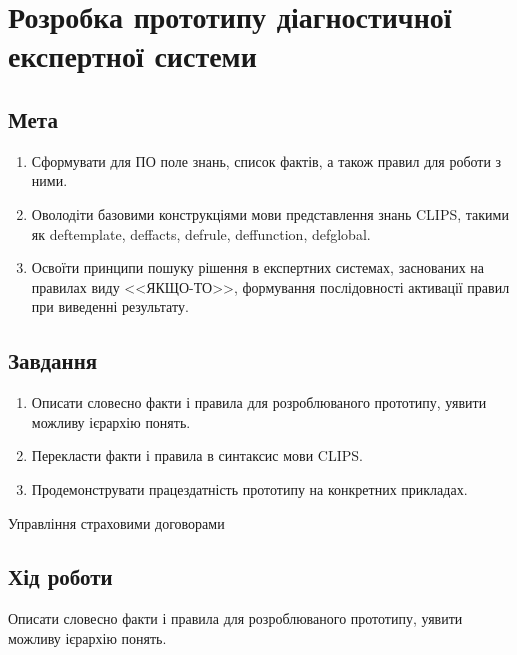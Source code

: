 



\newcommand{\labnumber}{4} %



\lstset{language=CLIPS}
\graphicspath{{figures/}}


\Ukrainian


\addtocounter{page}{1}

\section*{Розробка прототипу діагностичної експертної системи}
\subsection*{Мета}
\begin{enumerate}
	\item Сформувати для ПО поле знань, список фактів, а також правил для роботи з ними.
	\item Оволодіти базовими конструкціями мови представлення знань CLIPS, такими як deftemplate, deffacts, defrule, deffunction, defglobal.
	\item Освоїти принципи пошуку рішення в експертних системах, заснованих на правилах виду <<ЯКЩО-ТО>>, формування послідовності активації правил при виведенні результату.
\end{enumerate}

\subsection*{Завдання}
\begin{enumerate}
	\item Описати словесно факти і правила для розроблюваного прототипу, уявити можливу ієрархію понять. 
	\item Перекласти факти і правила в синтаксис мови CLIPS.
	\item Продемонструвати працездатність прототипу на конкретних прикладах.
\end{enumerate}

\begin{center}
Управління страховими договорами
\end{center}

\subsection*{Хід роботи}
Описати словесно факти і правила для розроблюваного прототипу, уявити можливу ієрархію понять.

